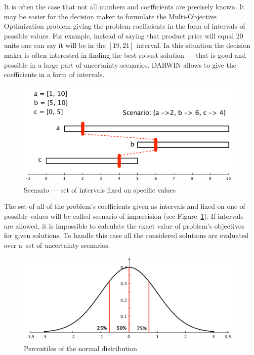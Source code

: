 It is often the case that not all numbers and coefficients are precisely
known. It may be easier for the decision maker to formulate the
Multi-Objective Optimization problem giving the problem coefficients in the
form of intervals of possible values. For example, instead of saying that
product price will equal 20 units one can say it will be in the $[19, 21]$
interval. In this situation the decision maker is often interested in finding
the best robust solution --- that is good and possible in a large part of
uncertainty scenarios. DARWIN allows to give the coefficients in a form of
intervals.

\begin{figure}
  \centering \includegraphics[scale=0.5]{img/scenario}
  \caption{Scenario --- set of intervals fixed on specific values}
  \label{scenario}
\end{figure}

The set of all of the problem's coefficients given as intervals and fixed on
one of possible values will be called scenario of imprecision (see
Figure~\ref{scenario}). If intervals are allowed, it is impossible to calculate
the exact value of problem's objectives for given solutions. To handle this
case all the considered solutions are evaluated over a~set of uncertainty
scenarios.

\begin{figure}
  \centering \includegraphics[scale=0.6]{img/percentile}
  \caption{Percentiles of the normal distribution}
  \label{percentiles}
\end{figure}

